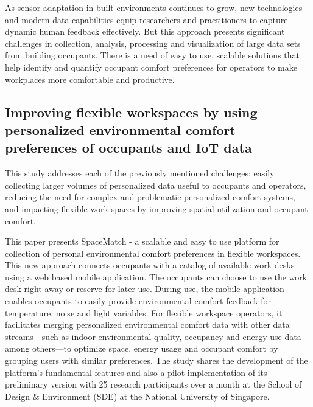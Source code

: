 \documentclass[]{interact}
\theoremstyle{plain}%
\theoremstyle{definition}
\theoremstyle{remark}
\begin{document}
As sensor adaptation in built environments continues to grow, new technologies and modern data capabilities equip researchers and practitioners to capture dynamic human feedback effectively. But this approach presents significant challenges in collection, analysis, processing and visualization of large data sets from building occupants. There is a need of easy to use, scalable solutions that help identify and quantify occupant comfort preferences for operators to make workplaces more comfortable and productive.


\subsection{Improving flexible workspaces by using personalized environmental comfort preferences of occupants and IoT data}

This study addresses each of the previously mentioned challenges: easily collecting larger volumes of personalized data useful to occupants and operators, reducing the need for complex and problematic personalized comfort systems, and impacting flexible work spaces by improving spatial utilization and occupant comfort. 

This paper presents SpaceMatch - a scalable and easy to use platform for collection of personal environmental comfort preferences in flexible workspaces. This new approach connects occupants with a catalog of available work desks using a web based mobile application. The occupants can choose to use the work desk right away or reserve for later use. During use, the mobile application enables occupants to easily provide environmental comfort feedback for temperature, noise and light variables. 
For flexible workspace operators, it facilitates merging personalized environmental comfort data with other data streams---such as indoor environmental quality, occupancy and energy use data among others---to optimize space, energy usage and occupant comfort by grouping users with similar preferences. The study shares the development of the platform's fundamental features and also a pilot implementation of its preliminary version with 25 research participants over a month at the School of Design & Environment (SDE) at the National University of Singapore. 
\end{document}
